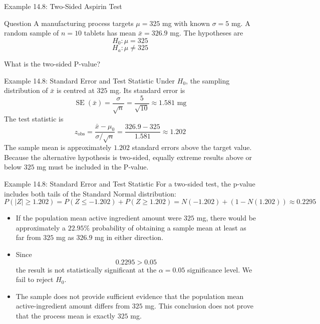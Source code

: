 \documentclass[aspectratio=169]{beamer}
\begin{document}
\begin{frame}{Example 14.8: Two-Sided Aspirin Test}
\begin{block}{Question}
A manufacturing process targets $\mu=325$ mg with known $\sigma=5$ mg. A random sample of $n=10$ tablets has mean $\bar{x}=326.9$ mg.
The hypotheses are
$$H_0:\mu=325$$
$$H_a:\mu\ne325$$

What is the two-sided P-value?
\end{block}
\end{frame}

\begin{frame}{Example 14.8: Standard Error and Test Statistic}
Under $H_0$, the sampling distribution of $\bar{x}$ is centred at $325$ mg. Its standard error is
$$\operatorname{SE}(\bar{x})=\frac{\sigma}{\sqrt{n}}=\frac{5}{\sqrt{10}}\approx1.581\text{ mg}$$
The test statistic is
$$z_{\mathrm{obs}}=\frac{\bar{x}-\mu_0}{\sigma/\sqrt{n}}=\frac{326.9-325}{1.581}\approx1.202$$
The sample mean is approximately $1.202$ standard errors above the target value. Because the alternative hypothesis is two-sided, equally extreme results above or below $325$ mg must be included in the P-value.
\end{frame}

\begin{frame}{Example 14.8: Standard Error and Test Statistic}
For a two-sided test, the p-value includes both tails of the Standard Normal distribution:
$$P(|Z|\geq1.202)=P(Z\leq-1.202)+P(Z\geq1.202)=N(-1.202)+(1-N(1.202))\approx0.2295$$

\begin{itemize}
	\item If the population mean active ingredient amount were $325$ mg, there would be approximately a $22.95\%$ probability of obtaining a sample mean at least as far from $325$ mg as $326.9$ mg in either direction.
	\item Since
	$$0.2295>0.05$$ 
	the result is not statistically significant at the $\alpha=0.05$ significance level. We fail to reject $H_0$.
	\item The sample does not provide sufficient evidence that the population mean active-ingredient amount differs from $325$ mg. This conclusion does not prove that the process mean is exactly $325$ mg.
\end{itemize}
\end{frame}
\end{document}
